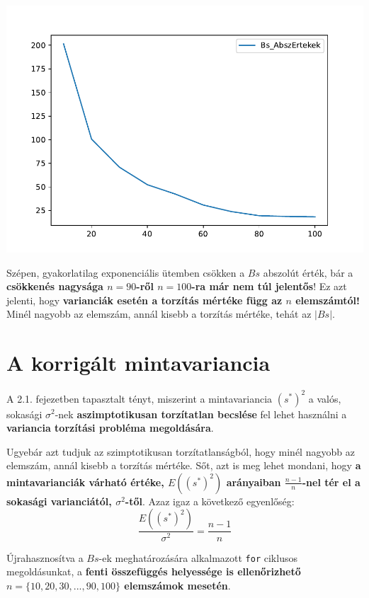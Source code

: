 \documentclass[
]{book}
\begin{document}
\includegraphics{_main_files/figure-latex/unnamed-chunk-239-1.pdf}

Szépen, gyakorlatilag exponenciális ütemben csökken a \(Bs\) abszolút érték, bár a \textbf{csökkenés nagysága \(n=90\)-ről \(n=100\)-ra már nem túl jelentős}! Ez azt jelenti, hogy \textbf{varianciák esetén a torzítás mértéke függ az \(n\) elemszámtól!} Minél nagyobb az elemszám, annál kisebb a torzítás mértéke, tehát az \(|Bs|\).

\section{A korrigált mintavariancia}\label{a-korriguxe1lt-mintavariancia}

A 2.1. fejezetben tapasztalt tényt, miszerint a mintavariancia \((s^*)^2\) a valós, sokasági \(\sigma^2\)-nek \textbf{aszimptotikusan torzítatlan becslése} fel lehet használni a \textbf{variancia torzítási probléma megoldására}.

Ugyebár azt tudjuk az szimptotikusan torzítatlanságból, hogy minél nagyobb az elemszám, annál kisebb a torzítás mértéke. Sőt, azt is meg lehet mondani, hogy \textbf{a mintavarianciák várható értéke, \(E\left((s^*)^2\right)\) arányaiban \(\frac{n-1}{n}\)-nel tér el a sokasági varianciától, \(\sigma^2\)-től}. Azaz igaz a következő egyenlőség: \[\frac{E\left((s^*)^2\right)}{\sigma^2}=\frac{n-1}{n}\]

Újrahasznosítva a \(Bs\)-ek meghatározására alkalmazott \texttt{for} ciklusos megoldásunkat, a \textbf{fenti összefüggés helyessége is ellenőrizhető \(n=\{10,20,30,...,90,100\}\) elemszámok mesetén}.
\end{document}
